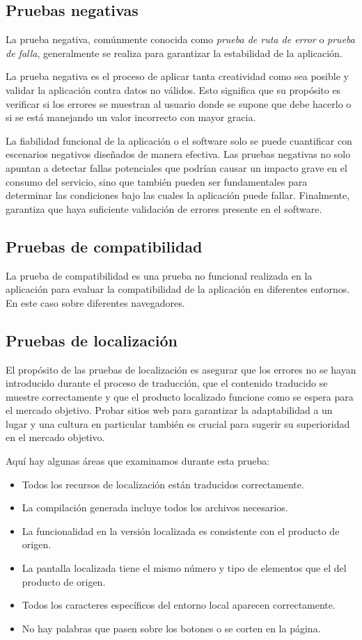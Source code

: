 \subsection{Pruebas negativas}
La prueba negativa, comúnmente conocida como \emph{prueba de ruta de error} o
\emph{prueba de falla}, generalmente se realiza para garantizar la estabilidad
de la aplicación.

La prueba negativa es el proceso de aplicar tanta creatividad como sea posible y
validar la aplicación contra datos no válidos. Esto significa que su propósito
es verificar si los errores se muestran al usuario donde se supone que debe
hacerlo o si se está manejando un valor incorrecto con mayor gracia.

La fiabilidad funcional de la aplicación o el software solo se puede cuantificar
con escenarios negativos diseñados de manera efectiva. Las pruebas negativas no
solo apuntan a detectar fallas potenciales que podrían causar un impacto grave
en el consumo del servicio, sino que también pueden ser fundamentales para
determinar las condiciones bajo las cuales la aplicación puede fallar.
Finalmente, garantiza que haya suficiente validación de errores presente en el
software\cite{Nadig}.

\subsection{Pruebas de compatibilidad}
La prueba de compatibilidad es una prueba no funcional realizada en la
aplicación para evaluar la compatibilidad de la aplicación en diferentes
entornos. En este caso sobre diferentes navegadores.

\subsection{Pruebas de localización}
El propósito de las pruebas de localización es asegurar que los errores no se
hayan introducido durante el proceso de traducción, que el contenido traducido
se muestre correctamente y que el producto localizado funcione como se espera
para el mercado objetivo. Probar sitios web para garantizar la adaptabilidad a
un lugar y una cultura en particular también es crucial para sugerir su
superioridad en el mercado objetivo\cite{Sampair}.

Aquí hay algunas áreas que examinamos durante esta prueba:

\begin{itemize}
\item Todos los recursos de localización están traducidos correctamente.
\item La compilación generada incluye todos los archivos necesarios.
\item La funcionalidad en la versión localizada es consistente con el producto de origen.
\item La pantalla localizada tiene el mismo número y tipo de elementos que el del producto de origen.
\item Todos los caracteres específicos del entorno local aparecen correctamente.
\item No hay palabras que pasen sobre los botones o se corten en la página.
\end{itemize}

